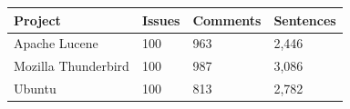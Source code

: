 \documentclass[a4paper,12pt,twoside]{report}
\begin{document}
\begin{table} %
    \centering
    \begin{adjustbox}{max width=\columnwidth}
    \def\arraystretch{1} %
    \begin{tabular}{p{4cm} p{1cm} p{2cm} p{3cm}}
        \toprule
        \textbf{Project} & \textbf{Issues} & \textbf{Comments} & \textbf{Sentences}\\
        \midrule
			Apache Lucene & 100 & 963 & 2,446\\
			Mozilla Thunderbird & 100 & 987 & 3,086\\ 
			Ubuntu & 100 & 813 & 2,782\\
        \midrule
    \end{tabular}
    \end{adjustbox}
    \label{tab:overviewRSS}
\end{table}
\end{document}
